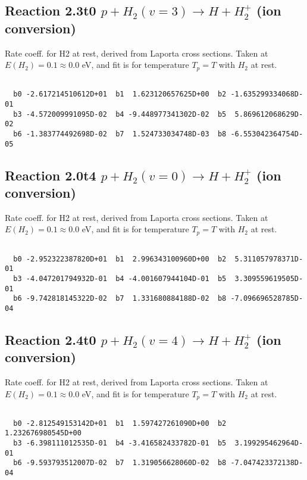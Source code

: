 \documentclass[12pt,dvipdfmx]{article}
\begin{document}
\newpage
\subsection{
Reaction 2.3t0
$ p + H_2(v=3) \rightarrow H + H_2^+$ (ion conversion)
}
Rate coeff. for H2 at rest, derived from Laporta cross sections.
Taken at $E(H_2) = 0.1 \approx 0.0$ eV,  and fit is for temperature $T_p=T$ with $H_2$ at rest.

\begin{small}\begin{verbatim}

  b0 -2.617214510612D+01  b1  1.623120657625D+00  b2 -1.635299334068D-01
  b3 -4.572009991095D-02  b4 -9.448977341302D-02  b5  5.869612068629D-02
  b6 -1.383774492698D-02  b7  1.524733034748D-03  b8 -6.553042364754D-05

\end{verbatim}\end{small}

\newpage
\subsection{
Reaction 2.0t4
$ p + H_2(v=0) \rightarrow H + H_2^+$ (ion conversion)
}
Rate coeff. for H2 at rest, derived from Laporta cross sections.
Taken at $E(H_2) = 0.1 \approx 0.0$ eV,  and fit is for temperature $T_p=T$ with $H_2$ at rest.

\begin{small}\begin{verbatim}

  b0 -2.952322387820D+01  b1  2.996343100960D+00  b2  5.311057978371D-01
  b3 -4.047201794932D-01  b4 -4.001607944104D-01  b5  3.309559619505D-01
  b6 -9.742818145322D-02  b7  1.331680884188D-02  b8 -7.096696528785D-04

\end{verbatim}\end{small}

\newpage
\subsection{
Reaction 2.4t0
$ p + H_2(v=4) \rightarrow H + H_2^+$ (ion conversion)
}
Rate coeff. for H2 at rest, derived from Laporta cross sections.
Taken at $E(H_2) = 0.1 \approx 0.0$ eV,  and fit is for temperature $T_p=T$ with $H_2$ at rest.

\begin{small}\begin{verbatim}

  b0 -2.812549153142D+01  b1  1.597427261090D+00  b2  1.232676980545D+00
  b3 -6.398111012535D-01  b4 -3.416582433782D-01  b5  3.199295462964D-01
  b6 -9.593793512007D-02  b7  1.319056628060D-02  b8 -7.047423372138D-04

\end{verbatim}\end{small}
\end{document}
